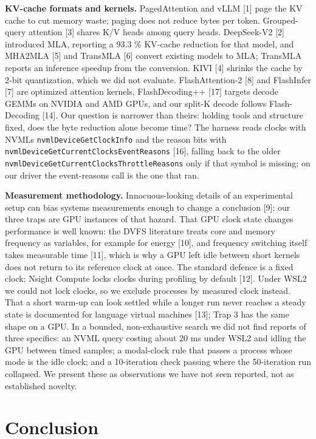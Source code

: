 \documentclass[conference]{IEEEtran}
\begin{document}
\textbf{KV-cache formats and kernels.} PagedAttention and vLLM {[}1{]} page the KV cache to cut memory waste; paging does not reduce bytes per token. Grouped-query attention {[}3{]} shares K/V heads among query heads. DeepSeek-V2 {[}2{]} introduced MLA, reporting a 93.3 \% KV-cache reduction for that model, and MHA2MLA {[}5{]} and TransMLA {[}6{]} convert existing models to MLA; TransMLA reports an inference speedup from the conversion. KIVI {[}4{]} shrinks the cache by 2-bit quantization, which we did not evaluate. FlashAttention-2 {[}8{]} and FlashInfer {[}7{]} are optimized attention kernels, FlashDecoding++ {[}17{]} targets decode GEMMs on NVIDIA and AMD GPUs, and our split-K decode follows Flash-Decoding {[}14{]}. Our question is narrower than theirs: holding tools and structure fixed, does the byte reduction alone become time? The harness reads clocks with NVML\textquotesingle s \texttt{nvmlDeviceGetClockInfo} and the reason bits with \texttt{nvmlDeviceGetCurrentClocksEventReasons} {[}16{]}, falling back to the older \texttt{nvmlDeviceGetCurrentClocksThrottleReasons} only if that symbol is missing; on our driver the event-reasons call is the one that ran.

\textbf{Measurement methodology.} Innocuous-looking details of an experimental setup can bias systems measurements enough to change a conclusion {[}9{]}; our three traps are GPU instances of that hazard. That GPU clock state changes performance is well known: the DVFS literature treats core and memory frequency as variables, for example for energy {[}10{]}, and frequency switching itself takes measurable time {[}11{]}, which is why a GPU left idle between short kernels does not return to its reference clock at once. The standard defence is a fixed clock; Nsight Compute locks clocks during profiling by default {[}12{]}. Under WSL2 we could not lock clocks, so we exclude processes by measured clock instead. That a short warm-up can look settled while a longer run never reaches a steady state is documented for language virtual machines {[}13{]}; Trap 3 has the same shape on a GPU. In a bounded, non-exhaustive search we did not find reports of three specifics: an NVML query costing about 20 ms under WSL2 and idling the GPU between timed samples; a modal-clock rule that passes a process whose mode is the idle clock; and a 10-iteration check passing where the 50-iteration run collapsed. We present these as observations we have not seen reported, not as established novelty.

\section{Conclusion}\label{sec:9}
\end{document}
